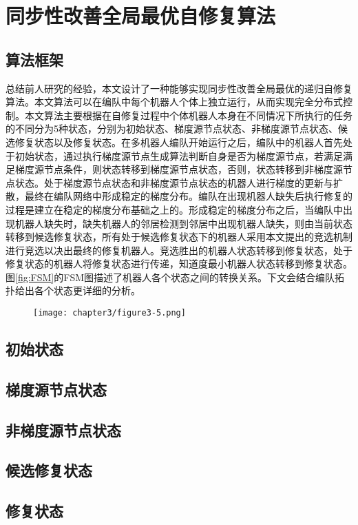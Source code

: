 \section{同步性改善全局最优自修复算法}

\subsection{算法框架}
总结前人研究的经验，本文设计了一种能够实现同步性改善全局最优的递归自修复算法。本文算法可以在编队中每个机器人个体上独立运行，从而实现完全分布式控制。本文算法主要根据在自修复过程中个体机器人本身在不同情况下所执行的任务的不同分为5种状态，分别为初始状态、梯度源节点状态、非梯度源节点状态、候选修复状态以及修复状态。在多机器人编队开始运行之后，编队中的机器人首先处于初始状态，通过执行梯度源节点生成算法判断自身是否为梯度源节点，若满足满足梯度源节点条件，则状态转移到梯度源节点状态，否则，状态转移到非梯度源节点状态。处于梯度源节点状态和非梯度源节点状态的机器人进行梯度的更新与扩散，最终在编队网络中形成稳定的梯度分布。编队在出现机器人缺失后执行修复的过程是建立在稳定的梯度分布基础之上的。形成稳定的梯度分布之后，当编队中出现机器人缺失时，缺失机器人的邻居检测到邻居中出现机器人缺失，则由当前状态转移到候选修复状态，所有处于候选修复状态下的机器人采用本文提出的竞选机制进行竞选以决出最终的修复机器人。竞选胜出的机器人状态转移到修复状态，处于修复状态的机器人将修复状态进行传递，知道度最小机器人状态转移到修复状态。图\ref{fig:FSM}的FSM图描述了机器人各个状态之间的转换关系。下文会结合编队拓扑给出各个状态更详细的分析。
\begin{figure}[!htbp]
	\centering
	\texttt{[image: chapter3/figure3-5.png]}
\end{figure}

\subsection{初始状态}

\subsection{梯度源节点状态}

\subsection{非梯度源节点状态}

\subsection{候选修复状态}

\subsection{修复状态}
